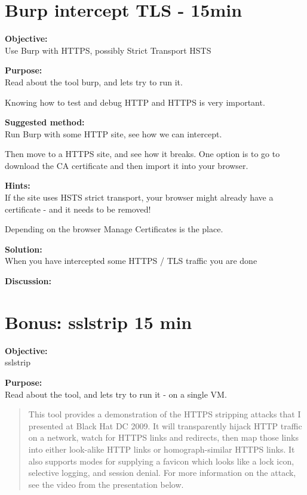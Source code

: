 \documentclass[a4paper,11pt,notitlepage]{report}
\begin{document}
\chapter{Burp intercept TLS - 15min}
\label{ex:burp-tls}

{\bf Objective:}\\
Use Burp with HTTPS, possibly Strict Transport HSTS

{\bf Purpose:}\\
Read about the tool burp, and lets try to run it.

Knowing how to test and debug HTTP and HTTPS is very important.

{\bf Suggested method:}\\
Run Burp with some HTTP site, see how we can intercept.

Then move to a HTTPS site, and see how it breaks. One option is to go to  download the CA certificate and then import it into your browser.


{\bf Hints:}\\
If the site uses HSTS strict transport, your browser might already have a certificate - and it needs to be removed!

Depending on the browser Manage Certificates is the place.

{\bf Solution:}\\
When you have intercepted some HTTPS / TLS traffic you are done

{\bf Discussion:}\\







\chapter{Bonus: sslstrip 15 min}
\label{ex:sslstrip}

{\bf Objective:}\\
sslstrip 

{\bf Purpose:}\\
Read about the tool, and lets try to run it - on a single VM.

\begin{quote}
This tool provides a demonstration of the HTTPS stripping attacks that I presented at Black Hat DC 2009. It will transparently hijack HTTP traffic on a network, watch for HTTPS links and redirects, then map those links into either look-alike HTTP links or homograph-similar HTTPS links. It also supports modes for supplying a favicon which looks like a lock icon, selective logging, and session denial. For more information on the attack, see the video from the presentation below.
\end{quote}
\end{document}
